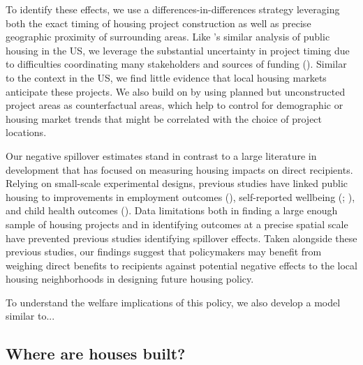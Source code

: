 \documentclass[12pt]{article}
\begin{document}
To identify these effects, we use a differences-in-differences strategy leveraging both the exact timing of housing project construction as well as precise geographic proximity of surrounding areas.  Like \cite{diamond2016wants}'s similar analysis of public housing in the US, we leverage the substantial uncertainty in project timing due to difficulties coordinating many stakeholders and sources of funding (\cite{serihistory}).  Similar to the context in the US, we find little evidence that local housing markets anticipate these projects.  We also build on \cite{diamond2016wants} by using planned but unconstructed project areas as counterfactual areas, which help to control for demographic or housing market trends that might be correlated with the choice of project locations.

Our negative spillover estimates stand in contrast to a large literature in development that has focused on measuring housing impacts on direct recipients.  Relying on small-scale experimental designs, previous studies have linked public housing to improvements in employment outcomes (\cite{franklin2016enabled}), self-reported wellbeing (\cite{galiani2017shelter}; \cite{devoto2012happiness}), and child health outcomes (\cite{cattaneo2009housing}).  Data limitations both in finding a large enough sample of housing projects and in identifying outcomes at a precise spatial scale have prevented previous studies identifying spillover effects.  Taken alongside these previous studies, our findings suggest that policymakers may benefit from weighing direct benefits to recipients against potential negative effects to the local housing neighborhoods in designing future housing policy.

To understand the welfare implications of this policy, we also develop a model similar to... 



\subsection{Where are houses built?}
\end{document}

